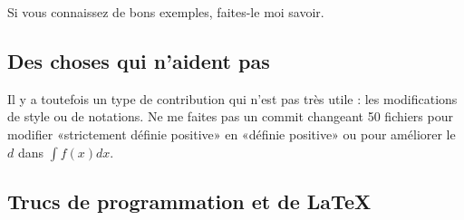Si vous connaissez de bons exemples, faites-le moi savoir.


\subsection{Des choses qui n'aident pas}

Il y a toutefois un type de contribution qui n'est pas très utile : les modifications de style ou de notations. Ne me faites pas un commit changeant 50 fichiers pour modifier «strictement définie positive» en «définie positive» ou pour améliorer le \( d\) dans \( \int f(x)dx\).

\subsection{Trucs de programmation et de \LaTeX}
\label{SUBooINTROhowtoContribProg}

